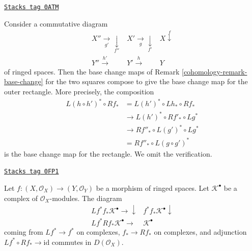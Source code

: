 \begin{remark}
\label{cohomology-remark-compose-base-change-horizontal}
\href{https://stacks.math.columbia.edu/tag/0ATM}{\texttt{Stacks tag 0ATM}}

Consider a commutative diagram
$$
\begin{array}{ccc}X'' \underset{g'}{\longrightarrow}\underset{f''}{\downarrow} & X' \underset{g}{\longrightarrow}\underset{f'}{\downarrow} & X \overset{f}{\downarrow} \\ Y'' \overset{h'}{\longrightarrow} & Y' \overset{h}{\longrightarrow} & Y\end{array}
$$
of ringed spaces. Then the base change maps of
Remark \ref{cohomology-remark-base-change}
for the two squares compose to give the base
change map for the outer rectangle. More precisely,
the composition
\begin{align*}
L(h \circ h')^* \circ Rf_*
& =
L(h')^* \circ Lh_* \circ Rf_* \\
& \to L(h')^* \circ Rf'_* \circ Lg^* \\
& \to Rf''_* \circ L(g')^* \circ Lg^* \\
& = Rf''_* \circ L(g \circ g')^*
\end{align*}
is the base change map for the rectangle. We omit the verification.
\end{remark}

\begin{lemma}
\label{cohomology-lemma-adjoints-push-pull-compatibility}
\href{https://stacks.math.columbia.edu/tag/0FP1}{\texttt{Stacks tag 0FP1}}

Let $f : (X, \mathcal{O}_X) \to (Y, \mathcal{O}_Y)$
be a morphism of ringed spaces. Let $\mathcal{K}^\bullet$
be a complex of $\mathcal{O}_X$-modules.
The diagram
$$
\begin{array}{cc}Lf^*f_*\mathcal{K}^\bullet \longrightarrow\downarrow & f^*f_*\mathcal{K}^\bullet \downarrow \\ Lf^*Rf_*\mathcal{K}^\bullet \longrightarrow & \mathcal{K}^\bullet\end{array}
$$
coming from $Lf^* \to f^*$ on complexes, $f_* \to Rf_*$ on complexes,
and adjunction $Lf^* \circ Rf_* \to \text{id}$
commutes in $D(\mathcal{O}_X)$.
\end{lemma}

